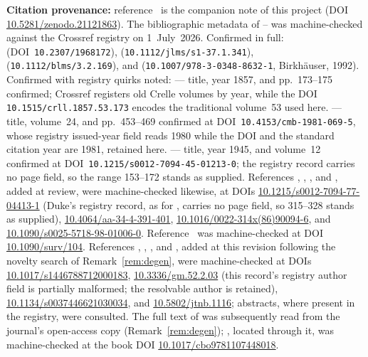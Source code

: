 \documentclass[11pt]{article}
\theoremstyle{plain}
\theoremstyle{definition}
\theoremstyle{remark}
\begin{document}
\medskip
\noindent\textbf{Citation provenance:} reference~\cite{CMC} is the
companion note of this project (DOI \url{10.5281/zenodo.21121863}). The bibliographic metadata of
\cite{Kronecker}--\cite{Bertin} was machine-checked against the Crossref
registry on 1~July~2026. Confirmed in full: \cite{Lehmer}
(DOI~\texttt{10.2307/1968172}), \cite{Mahler}
(\texttt{10.1112/jlms/s1-37.1.341}), \cite{Smyth}
(\texttt{10.1112/blms/3.2.169}), and \cite{Bertin}
(\texttt{10.1007/978-3-0348-8632-1}, Birkh\"auser, 1992). Confirmed with
registry quirks noted: \cite{Kronecker} --- title, year 1857, and
pp.~173--175 confirmed; Crossref registers old Crelle volumes by year, while
the DOI \texttt{10.1515/crll.1857.53.173} encodes the traditional volume~53
used here. \cite{Boyd} --- title, volume~24, and pp.~453--469 confirmed at
DOI~\texttt{10.4153/cmb-1981-069-5}, whose registry issued-year field reads
1980 while the DOI and the standard citation year are 1981, retained here.
\cite{Salem} --- title, year 1945, and volume~12 confirmed at
DOI~\texttt{10.1215/s0012-7094-45-01213-0}; the registry record carries no
page field, so the range 153--172 stands as supplied. References
\cite{Boyd1977}, \cite{Dobrowolski}, \cite{Smyth1986}, and
\cite{Mossinghoff}, added at review, were machine-checked likewise, at DOIs
\url{10.1215/s0012-7094-77-04413-1} (Duke's registry record, as for
\cite{Salem}, carries no page field, so 315--328 stands as supplied),
\url{10.4064/aa-34-4-391-401}, \url{10.1016/0022-314x(86)90094-6}, and
\url{10.1090/s0025-5718-98-01006-0}. Reference~\cite{EPSW} was
machine-checked at DOI \url{10.1090/surv/104}. References \cite{Dub2012},
\cite{Dub2017}, \cite{Dub2021}, and \cite{DJ2020}, added at this revision
following the novelty search of Remark~\ref{rem:degen}, were machine-checked
at DOIs \url{10.1017/s1446788712000183}, \url{10.3336/gm.52.2.03} (this
record's registry author field is partially malformed; the resolvable
author is retained), \url{10.1134/s0037446621030034}, and
\url{10.5802/jtnb.1116}; abstracts, where present in the registry, were
consulted. The full text of \cite{Dub2017} was subsequently read from the
journal's open-access copy (Remark~\ref{rem:degen}); \cite{Masser}, located
through it, was machine-checked at the book DOI
\url{10.1017/cbo9781107448018}.
\end{document}
